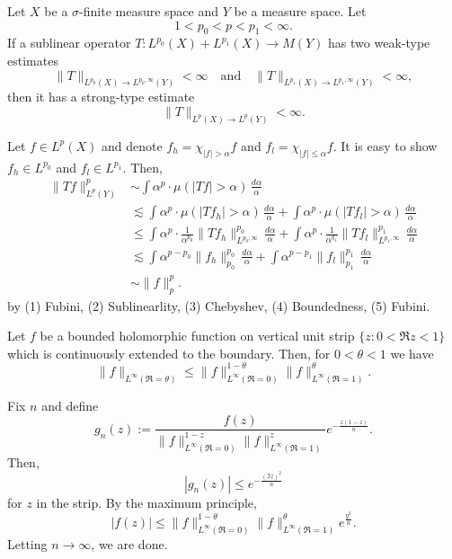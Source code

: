 \documentclass{../../large}
\begin{document}
\begin{prb}
Let $X$ be a $\sigma$-finite measure space and $Y$ be a measure space.
Let
\[1<p_0<p<p_1<\infty.\]
If a sublinear operator $T\colon L^{p_0}(X)+L^{p_1}(X)\to M(Y)$ has two weak-type estimates
\[\|T\|_{L^{p_0}(X)\to L^{p_0,\infty}(Y)}<\infty\quad\text{and}\quad\|T\|_{L^{p_1}(X)\to L^{p_1,\infty}(Y)}<\infty,\]
then it has a strong-type estimate
\[\|T\|_{L^p(X)\to L^p(Y)}<\infty.\]
\end{prb}
\begin{pf}
Let $f\in L^p(X)$ and denote $f_h=\chi_{|f|>\alpha}f$ and $f_l=\chi_{|f|\le\alpha}f$.
It is easy to show $f_h\in L^{p_0}$ and $f_l\in L^{p_1}$.
Then,
\begin{align*} %
\|Tf\|_{L^p(Y)}^p&\sim\int\alpha^p\cdot\mu(|Tf|>\alpha)\,\frac{d\alpha}\alpha\\
&\lesssim\int\alpha^p\cdot\mu(|Tf_h|>\alpha)\,\frac{d\alpha}\alpha+\int\alpha^p\cdot\mu(|Tf_l|>\alpha)\,\frac{d\alpha}\alpha\\
&\le\int\alpha^p\cdot\frac1{\alpha^{p_0}}\|Tf_h\|_{L^{p_0,\infty}}^{p_0}\,\frac{d\alpha}\alpha+\int\alpha^p\cdot\frac1{\alpha^{q_1}}\|Tf_l\|_{L^{p_1,\infty}}^{p_1}\,\frac{d\alpha}\alpha\\
&\lesssim\int\alpha^{p-p_0}\|f_h\|_{p_0}^{p_0}\,\frac{d\alpha}\alpha+\int\alpha^{p-p_1}\|f_l\|_{p_1}^{p_1}\,\frac{d\alpha}\alpha\\
&\sim\|f\|_p^p.
\end{align*}
by (1) Fubini, (2) Sublinearlity, (3) Chebyshev, (4) Boundedness, (5) Fubini.
\end{pf}

\begin{prb}
Let $f$ be a bounded holomorphic function on vertical unit strip $\{z:0<\Re z<1\}$ which is continuously extended to the boundary.
Then, for $0<\theta<1$ we have
\[\|f\|_{L^\infty(\Re=\theta)}\le\|f\|_{L^\infty(\Re=0)}^{1-\theta}\|f\|_{L^\infty(\Re=1)}^\theta.\]
\end{prb}
\begin{pf}
Fix $n$ and define
\[g_n(z):=\frac{f(z)}{\|f\|_{L^\infty(\Re=0)}^{1-z}\|f\|_{L^\infty(\Re=1)}^z}e^{-\frac{z(1-z)}n}.\]
Then,
\[|g_n(z)|\le e^{-\frac{(\Im z)^2}n}\]
for $z$ in the strip.
By the maximum principle,
\[|f(z)|\le\|f\|_{L^\infty(\Re=0)}^{1-\theta}\|f\|_{L^\infty(\Re=1)}^\theta e^{\frac{y^2}n}.\]
Letting $n\to\infty$, we are done.
\end{pf}
\end{document}
